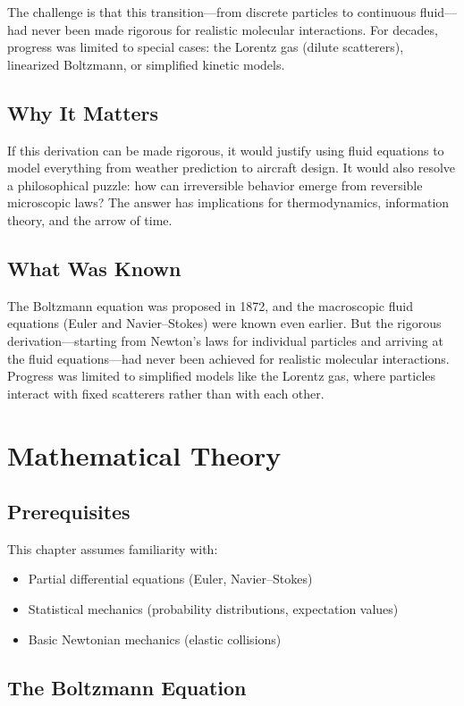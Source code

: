 The challenge is that this transition---from discrete particles to continuous fluid---had never been made rigorous for realistic molecular interactions. For decades, progress was limited to special cases: the Lorentz gas (dilute scatterers), linearized Boltzmann, or simplified kinetic models.

\subsection{Why It Matters}
If this derivation can be made rigorous, it would justify using fluid equations to model everything from weather prediction to aircraft design. It would also resolve a philosophical puzzle: how can irreversible behavior emerge from reversible microscopic laws? The answer has implications for thermodynamics, information theory, and the arrow of time.

\subsection{What Was Known}
The Boltzmann equation was proposed in 1872, and the macroscopic fluid equations (Euler and Navier--Stokes) were known even earlier. But the rigorous derivation---starting from Newton's laws for individual particles and arriving at the fluid equations---had never been achieved for realistic molecular interactions. Progress was limited to simplified models like the Lorentz gas, where particles interact with fixed scatterers rather than with each other.

\section{Mathematical Theory}

\subsection{Prerequisites}
This chapter assumes familiarity with:
\begin{itemize}
\item Partial differential equations (Euler, Navier--Stokes)
\item Statistical mechanics (probability distributions, expectation values)
\item Basic Newtonian mechanics (elastic collisions)
\end{itemize}

\subsection{The Boltzmann Equation}

